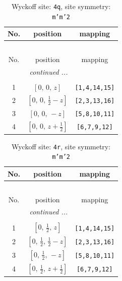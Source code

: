 \documentclass[fleqn,8pt]{jsarticle}
\begin{document}
\renewcommand{\arraystretch}{1.2}
\begin{longtable}{ccc}
\caption{Wyckoff site: {\tt 4q}, site symmetry: {\tt m'm'2}}
 \\
 \hline \hline
No. & position & mapping \\ \hline \endfirsthead

\multicolumn{2}{l}{\tablename\ \thetable{}} \\
 \hline \hline
No. & position & mapping \\ \hline \endhead

 \hline \hline
\multicolumn{2}{r}{\footnotesize\it continued ...} \\ \endfoot

 \hline \hline
\multicolumn{2}{r}{} \\ \endlastfoot

1 & $\left[ 0,\, 0,\, z \right]$ & {\tt [1,4,14,15]} \\ \hline
2 & $\left[ 0,\, 0,\, \frac{1}{2} - z \right]$ & {\tt [2,3,13,16]} \\ \hline
3 & $\left[ 0,\, 0,\, - z \right]$ & {\tt [5,8,10,11]} \\ \hline
4 & $\left[ 0,\, 0,\, z + \frac{1}{2} \right]$ & {\tt [6,7,9,12]} \\
\end{longtable}
\renewcommand{\arraystretch}{1.2}
\begin{longtable}{ccc}
\caption{Wyckoff site: {\tt 4r}, site symmetry: {\tt m'm'2}}
 \\
 \hline \hline
No. & position & mapping \\ \hline \endfirsthead

\multicolumn{2}{l}{\tablename\ \thetable{}} \\
 \hline \hline
No. & position & mapping \\ \hline \endhead

 \hline \hline
\multicolumn{2}{r}{\footnotesize\it continued ...} \\ \endfoot

 \hline \hline
\multicolumn{2}{r}{} \\ \endlastfoot

1 & $\left[ 0,\, \frac{1}{2},\, z \right]$ & {\tt [1,4,14,15]} \\ \hline
2 & $\left[ 0,\, \frac{1}{2},\, \frac{1}{2} - z \right]$ & {\tt [2,3,13,16]} \\ \hline
3 & $\left[ 0,\, \frac{1}{2},\, - z \right]$ & {\tt [5,8,10,11]} \\ \hline
4 & $\left[ 0,\, \frac{1}{2},\, z + \frac{1}{2} \right]$ & {\tt [6,7,9,12]} \\
\end{longtable}
\end{document}
